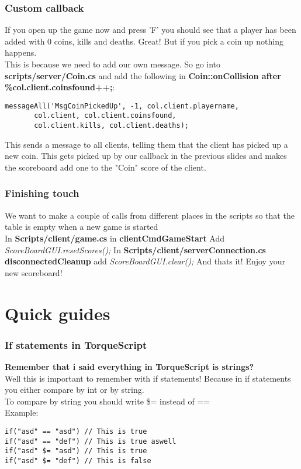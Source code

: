 \begin{frame}[fragile]
\frametitle{Custom callback}
If you open up the game now and press 'F' you should see that a player has been added with 0 coins, kills and deaths. Great! But if you pick a coin up nothing happens.\\
This is because we need to add our own message. So go into {\bf scripts/server/Coin.cs} and add the following in {\bf Coin::onCollision after \%col.client.coinsfound++;}:
\TSS
\begin{lstlisting}
messageAll('MsgCoinPickedUp', -1, col.client.playername, 
       col.client, col.client.coinsfound, 
       col.client.kills, col.client.deaths);
\end{lstlisting}
This sends a message to all clients, telling them that the client has picked up a new coin. This gets picked up by our callback in the previous slides and makes the scoreboard add
one to the "Coin" score of the client.
\end{frame}

\begin{frame}
\frametitle{Finishing touch}
We want to make a couple of calls from different places in the scripts so that the table is empty when a new game is started\\
In {\bf Scripts/client/game.cs} in {\bf clientCmdGameStart} Add {\it ScoreBoardGUI.resetScores();}
In {\bf Scripts/client/serverConnection.cs} {\bf disconnectedCleanup} add {\it ScoreBoardGUI.clear();}
And thats it! Enjoy your new scoreboard!
\end{frame}

\section{Quick guides}
\begin{frame}[fragile]
\hypertarget{QG-IfStatements}{}
\frametitle{If statements in TorqueScript}
{\bf Remember that i said everything in TorqueScript is strings?}\\
Well this is important to remember with if statements! Because in if statements you either compare by int or by string.\\
To compare by string you should write \$= instead of ==\\
Example:
\TS
\begin{lstlisting}
if("asd" == "asd") // This is true
if("asd" == "def") // This is true aswell
if("asd" $= "asd") // This is true
if("asd" $= "def") // This is false
\end{lstlisting}
\end{frame}

